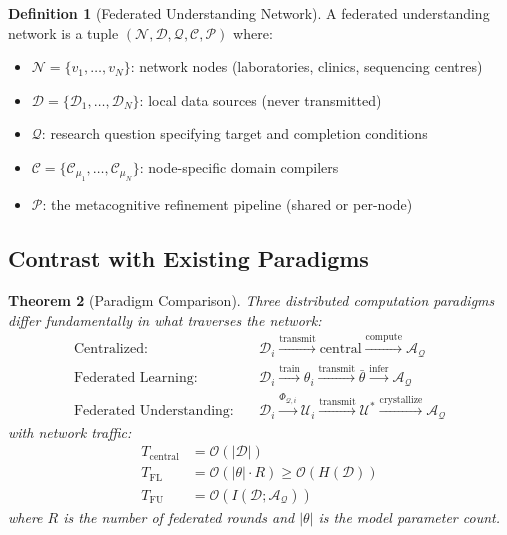 \documentclass[10pt,twocolumn]{article}
\newtheorem{theorem}{Theorem}[section]
\theoremstyle{definition}
\newtheorem{definition}[theorem]{Definition}
\theoremstyle{remark}
\newcommand{\morphism}{\Phi}
\newcommand{\question}{\mathcal{Q}}
\newcommand{\answer}{\mathcal{A}}
\newcommand{\dataset}{\mathcal{D}}
\newcommand{\params}{\theta}
\newcommand{\understanding}{\mathcal{U}}
\newcommand{\pipeline}{\mathcal{P}}
\newcommand{\node}{\mathcal{N}}
\begin{document}
\begin{definition}[Federated Understanding Network]
A federated understanding network is a tuple $(\node, \dataset, \question, \mathcal{C}, \pipeline)$ where:
\begin{itemize}[nosep]
\item $\node = \{v_1, \ldots, v_N\}$: network nodes (laboratories, clinics, sequencing centres)
\item $\dataset = \{\dataset_1, \ldots, \dataset_N\}$: local data sources (never transmitted)
\item $\question$: research question specifying target and completion conditions
\item $\mathcal{C} = \{\mathcal{C}_{\mu_1}, \ldots, \mathcal{C}_{\mu_N}\}$: node-specific domain compilers
\item $\pipeline$: the metacognitive refinement pipeline (shared or per-node)
\end{itemize}
\end{definition}

\subsection{Contrast with Existing Paradigms}

\begin{theorem}[Paradigm Comparison]
\label{thm:paradigm_comparison}
Three distributed computation paradigms differ fundamentally in what traverses the network:
\begin{align}
\text{Centralized}: \quad & \dataset_i \xrightarrow{\text{transmit}} \text{central} \xrightarrow{\text{compute}} \answer_\question \\
\text{Federated Learning}: \quad & \dataset_i \xrightarrow{\text{train}} \params_i \xrightarrow{\text{transmit}} \bar{\params} \xrightarrow{\text{infer}} \answer_\question \\
\text{Federated Understanding}: \quad & \dataset_i \xrightarrow{\morphism_{\question,i}} \understanding_i \xrightarrow{\text{transmit}} \understanding^* \xrightarrow{\text{crystallize}} \answer_\question
\end{align}
with network traffic:
\begin{align}
T_{\text{central}} &= \mathcal{O}(|\dataset|) \\
T_{\text{FL}} &= \mathcal{O}(|\params| \cdot R) \geq \mathcal{O}(H(\dataset)) \\
T_{\text{FU}} &= \mathcal{O}(I(\dataset; \answer_\question))
\end{align}
where $R$ is the number of federated rounds and $|\params|$ is the model parameter count.
\end{theorem}
\end{document}
